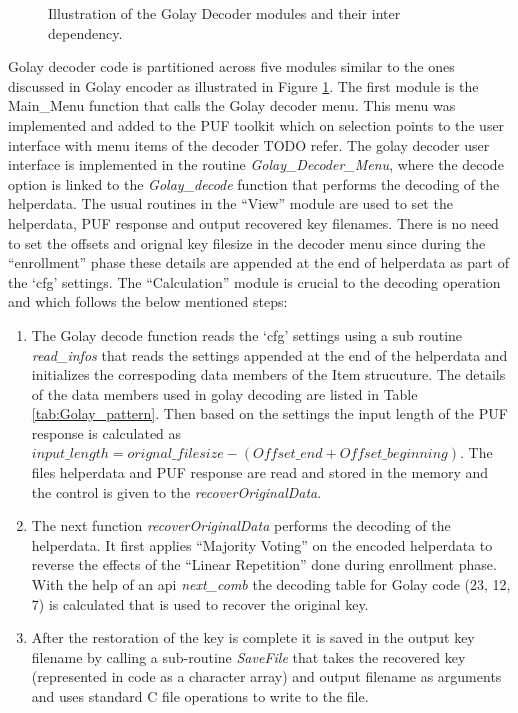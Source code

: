 	\begin{figure}
	\centering
	\caption{Illustration of the Golay Decoder modules and their inter dependency.}
	\label{img:golay_decoder_fns}
	\end{figure}

	Golay decoder code is partitioned across five modules similar to the ones discussed in Golay encoder as illustrated in Figure \ref{img:golay_decoder_fns}. The first module is the Main\_Menu function that calls the Golay decoder menu. This menu was implemented and added to the PUF toolkit which on selection points to the user interface with menu items of the decoder TODO refer. The golay decoder user interface is implemented in the routine \emph{Golay\_Decoder\_Menu}, where the decode option is linked to the \emph{Golay\_decode}
	function that performs the decoding of the helperdata. The usual routines in the ``View'' module are used to set the helperdata, PUF response and output recovered key filenames. There is no need to set the offsets and orignal key filesize in the decoder menu since during the ``enrollment'' phase these details are appended at the end of helperdata as part of the `cfg' settings. The ``Calculation'' module is crucial to the decoding operation and which follows the below mentioned
	steps:
	\begin{enumerate}
		\item The Golay decode function reads the `cfg' settings using a sub routine \emph{read\_infos} that reads the settings appended at the end of the helperdata and initializes the correspoding data members of the Item strucuture. The details of the data members used in golay decoding are listed in Table \ref{tab:Golay_pattern}. Then based on the settings the input length of the PUF response is calculated as $input\_length = orignal\_filesize - (Offset\_end + Offset\_beginning)$. The files
			helperdata and PUF response are read and stored in the memory and the control is given to the \emph{recoverOriginalData}.
		\item The next function \emph{recoverOriginalData} performs the decoding of the helperdata. It first applies ``Majority Voting'' on the encoded helperdata to reverse the effects of the ``Linear Repetition'' done during enrollment phase. With the help of an api \emph{next\_comb} the decoding table for Golay code (23, 12, 7) is calculated that is used to recover the original key.
		\item After the restoration of the key is complete it is saved in the output key filename by calling a
			sub-routine \emph{SaveFile} that takes the recovered key (represented in code as a character array) and output filename as arguments and uses standard C file operations to write to the file.
	\end{enumerate}

